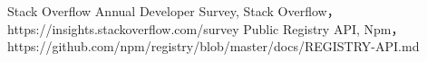 \documentclass[main]{subfiles}
\begin{document}
\begin{thebibliography}{9}\setlength{\itemsep}{-2pt}

 Stack Overflow Annual Developer Survey, Stack Overflow，https://insights.stackoverflow.com/survey
 Public Registry API, Npm，https://github.com/npm/registry/blob/master/docs/REGISTRY-API.md
\end{thebibliography}
\end{document}
